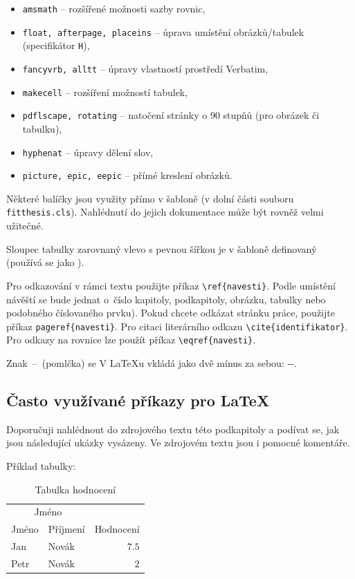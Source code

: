 \begin{itemize}
  \item \verb|amsmath| -- rozšířené možnosti sazby rovnic,
  \item \verb|float, afterpage, placeins| -- úprava umístění obrázků/tabulek (specifikátor \texttt{H}),
  \item \verb|fancyvrb, alltt| -- úpravy vlastností prostředí Verbatim,
  \item \verb|makecell| -- rozšíření možností tabulek,
  \item \verb|pdflscape, rotating| -- natočení stránky o 90 stupňů (pro obrázek či tabulku),
  \item \verb|hyphenat| -- úpravy dělení slov,
  \item \verb|picture, epic, eepic| -- přímé kreslení obrázků.
\end{itemize}

Některé balíčky jsou využity přímo v šabloně (v dolní části souboru \texttt{fitthesis.cls}). Nahlédnutí do jejich dokumentace může být rovněž velmi užitečné.

Sloupec tabulky zarovnaný vlevo s pevnou šířkou je v šabloně definovaný  (používá se jako ).

Pro odkazování v rámci textu použijte příkaz \verb|\ref{navesti}|. Podle umístění návěští se bude jednat o~číslo kapitoly, podkapitoly, obrázku, tabulky nebo podobného číslovaného prvku). Pokud chcete odkázat stránku práce, použijte příkaz \verb|pageref{navesti}|. Pro citaci literárního odkazu \verb|\cite{identifikator}|. Pro odkazy na rovnice lze použít příkaz \verb|\eqref{navesti}|.

Znak \,--\, (pomlčka) se V \LaTeX u vkládá jako dvě mínus za sebou: -{}-.

\subsection*{Často využívané příkazy pro \LaTeX{}}
\label{sec:Fragments}

Doporučuji nahlédnout do zdrojového textu této podkapitoly a podívat se, jak jsou následující ukázky vysázeny. Ve zdrojovém textu jsou i pomocné komentáře.


Příklad tabulky:
\begin{table}[H]
	\vskip6pt
	\caption{Tabulka hodnocení}
    \vskip6pt
	\centering
	\begin{tabular}{llr}
		\toprule
		\multicolumn{2}{c}{Jméno} \\
		\cmidrule(r){1-2}
		Jméno & Příjmení & Hodnocení \\
		\midrule
		Jan & Novák & $7.5$ \\
		Petr & Novák & $2$ \\
		\bottomrule
	\end{tabular}
	\label{tab:ExampleTable}
\end{table}

